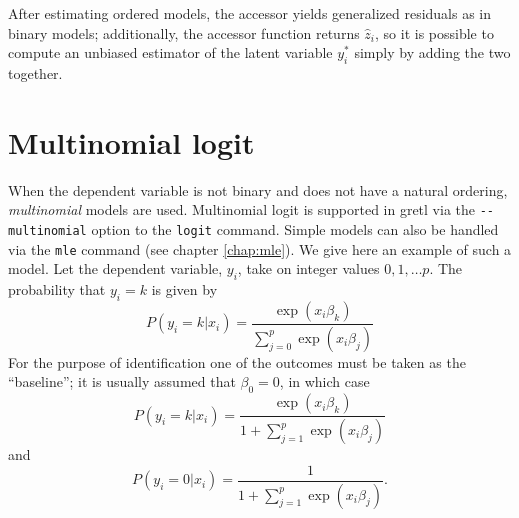 After estimating ordered models, the  accessor yields
generalized residuals as in binary models; additionally, the
 accessor function returns $\hat{z}_i$, so it is
possible to compute an unbiased estimator of the latent variable
$y^*_i$ simply by adding the two together.

\section{Multinomial logit}
\label{sec:mlogit}

When the dependent variable is not binary and does not have a natural
ordering, \emph{multinomial} models are used.  Multinomial logit is
supported in gretl via the \verb|--multinomial| option to the
\texttt{logit} command.  Simple models can also be handled via the
\texttt{mle} command (see chapter \ref{chap:mle}). We give here an
example of such a model.  Let the dependent variable, $y_i$, take on
integer values $0,1,\dots p$.  The probability that $y_i = k$ is given
by
\[
  P(y_i = k |  x_i) = \frac{\exp(x_i \beta_k)}{\sum_{j=0}^p \exp(x_i \beta_j)}
\]
For the purpose of identification one of the outcomes must be taken as
the ``baseline''; it is usually assumed that $\beta_0 = 0$, in which case
\[
  P(y_i = k |  x_i) = \frac{\exp(x_i \beta_k)}{1 + \sum_{j=1}^p \exp(x_i \beta_j)} 
\]
and
\[
  P(y_i = 0 |  x_i) = \frac{1}{1 + \sum_{j=1}^p \exp(x_i \beta_j)} .
\]

